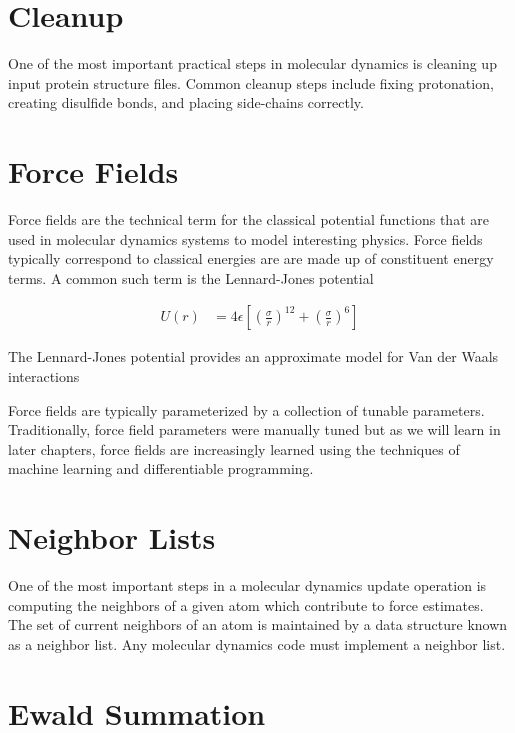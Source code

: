 \documentclass[book.tex]{subfiles}
\begin{document}
\section{Cleanup}

One of the most important practical steps in molecular dynamics is cleaning up input protein structure files. Common cleanup steps include fixing protonation, creating disulfide bonds, and placing side-chains correctly. 

\section{Force Fields}

Force fields are the technical term for the classical potential functions that are used in molecular dynamics systems to model interesting physics. Force fields typically correspond to classical energies are are made up of constituent energy terms. A common such term is the Lennard-Jones potential

\begin{align}
    U(r) &= 4 \epsilon \left [ \left ( \frac{\sigma}{r} \right )^{12} + \left( \frac{\sigma}{r} \right )^6 \right ]
\end{align}

The Lennard-Jones potential provides an approximate model for Van der Waals interactions 



Force fields are typically parameterized by a collection of tunable parameters. Traditionally, force field parameters were manually tuned but as we will learn in later chapters, force fields are increasingly learned using the techniques of machine learning and differentiable programming.

\section{Neighbor Lists}

One of the most important steps in a molecular dynamics update operation is computing the neighbors of a given atom which contribute to force estimates. The set of current neighbors of an atom is maintained by a data structure known as a neighbor list. Any molecular dynamics code must implement a neighbor list.

\section{Ewald Summation}
\end{document}
